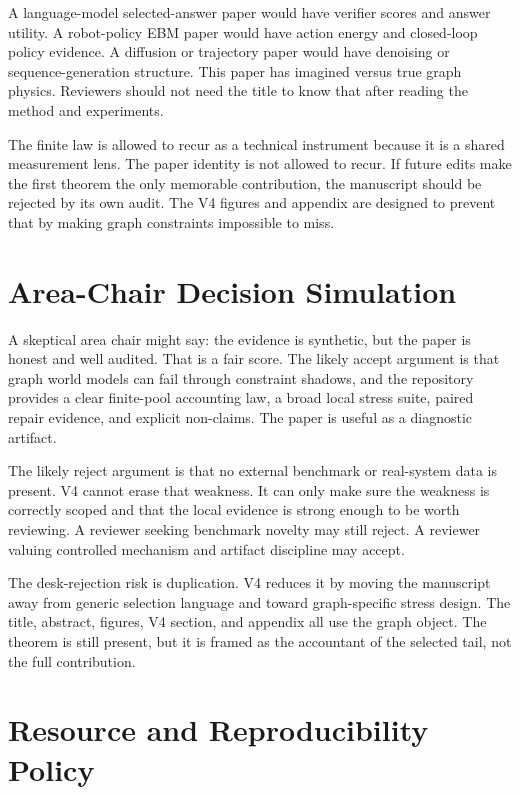 \documentclass{article}
\begin{document}
A language-model selected-answer paper would have verifier scores and answer
utility.  A robot-policy EBM paper would have action energy and closed-loop
policy evidence.  A diffusion or trajectory paper would have denoising or
sequence-generation structure.  This paper has imagined versus true graph
physics.  Reviewers should not need the title to know that after reading the
method and experiments.

The finite law is allowed to recur as a technical instrument because it is a
shared measurement lens.  The paper identity is not allowed to recur.  If future
edits make the first theorem the only memorable contribution, the manuscript
should be rejected by its own audit.  The V4 figures and appendix are designed
to prevent that by making graph constraints impossible to miss.

\section{Area-Chair Decision Simulation}

A skeptical area chair might say: the evidence is synthetic, but the paper is
honest and well audited.  That is a fair score.  The likely accept argument is
that graph world models can fail through constraint shadows, and the repository
provides a clear finite-pool accounting law, a broad local stress suite, paired
repair evidence, and explicit non-claims.  The paper is useful as a diagnostic
artifact.

The likely reject argument is that no external benchmark or real-system data is
present.  V4 cannot erase that weakness.  It can only make sure the weakness is
correctly scoped and that the local evidence is strong enough to be worth
reviewing.  A reviewer seeking benchmark novelty may still reject.  A reviewer
valuing controlled mechanism and artifact discipline may accept.

The desk-rejection risk is duplication.  V4 reduces it by moving the manuscript
away from generic selection language and toward graph-specific stress design.
The title, abstract, figures, V4 section, and appendix all use the graph object.
The theorem is still present, but it is framed as the accountant of the selected
tail, not the full contribution.

\section{Resource and Reproducibility Policy}
\end{document}
